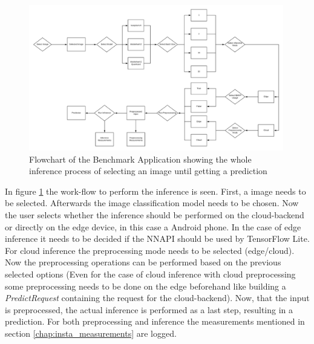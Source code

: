 \begin{figure}[!htb]
\centering
\includegraphics[width=0.99\textwidth]{./Bilder/FlowChart_App.png}
\caption{Flowchart of the Benchmark Application showing the whole inference process of selecting an image until getting a prediction}
\label{fig:app}
\end{figure}
In figure \ref{fig:app} the work-flow to perform the inference is seen. First, a image needs to be selected. Afterwards the image classification model needs to be chosen. Now the user selects whether the inference should be performed on the cloud-backend or directly on the edge device, in this case a Android phone. In the case of edge inference it needs to be decided if the NNAPI should be used by TensorFlow Lite. For cloud inference the preprocessing mode needs to be selected (edge/cloud). Now the preprocessing operations can be performed based on the previous selected options (Even for the case of cloud inference with cloud preprocessing some preprocessing needs to be done on the edge beforehand like building a \emph{PredictRequest} containing the request for the cloud-backend). Now, that the input is preprocessed, the actual inference is performed as a last step, resulting in a prediction. For both preprocessing and inference the measurements mentioned in section \ref{chap:insta_measurements} are logged.

